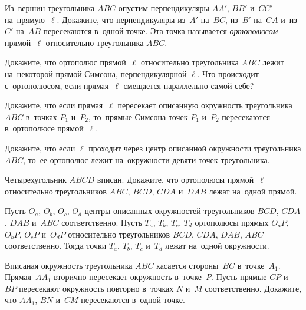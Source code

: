 


\begin{problems}

\item
Из~вершин треугольника $ABC$ опустим перпендикуляры $AA'$, $BB'$ и~$CC'$
на~прямую~$\ell$.
Докажите, что перпендикуляры из~$A'$ на~$BC$, из~$B'$ на~$CA$ и~из~$C'$ на~$AB$
пересекаются в~одной точке.
Эта точка называется \emph{ортополюсом} прямой~$\ell$ относительно
треугольника $ABC$.

\item
Докажите, что ортополюс прямой~$\ell$ относительно треугольника $ABC$ лежит
на~некоторой прямой Симсона, перпендикулярной $\ell$.
Что происходит с~ортополюсом, если прямая~$\ell$ смещается параллельно самой
себе?

\item
Докажите, что если прямая~$\ell$ пересекает описанную окружность
треугольника $ABC$ в~точках $P_{1}$ и~$P_{2}$, то~прямые Симсона
точек $P_{1}$ и~$P_{2}$ пересекаются в~ортополюсе прямой~$\ell$.

\item
Докажите, что если $\ell$ проходит через центр описанной окружности
треугольника $ABC$, то~ее ортополюс лежит на~окружности девяти точек
треугольника.

\item
Четырехугольник $ABCD$ вписан.
Докажите, что ортополюсы прямой~$\ell$ относительно
треугольников $ABC$, $BCD$, $CDA$ и~$DAB$ лежат на~одной прямой.

\item
Пусть $O_{a}$, $O_{b}$, $O_{c}$, $O_{d}$ центры описанных окружностей
треугольников $BCD$, $CDA$, $DAB$ и~$ABC$ соответственно.
Пусть $T_{a}$, $T_{b}$, $T_{c}$, $T_{d}$ ортополюсы
прямых $O_{a}P$, $O_{b}P$, $O_{c}P$ и~$O_{d}P$ относительно
треугольников $BCD$, $CDA$, $DAB$, $ABC$ соответственно.
Тогда точки $T_{a}$, $T_{b}$, $T_{c}$ и~$T_{d}$ лежат на~одной окружности.

\item
Вписаная окружность треугольника $ABC$ касается стороны~$BC$ в~точке~$A_{1}$.
Прямая~$AA_{1}$ вторично пересекает окружность в~точке~$P$.
Пусть прямые $CP$ и~$BP$ пересекают окружность повторно в~точках $N$ и~$M$
соответственно.
Докажите, что $AA_{1}$, $BN$ и~$CM$ пересекаются в~одной точке.


\end{problems}
